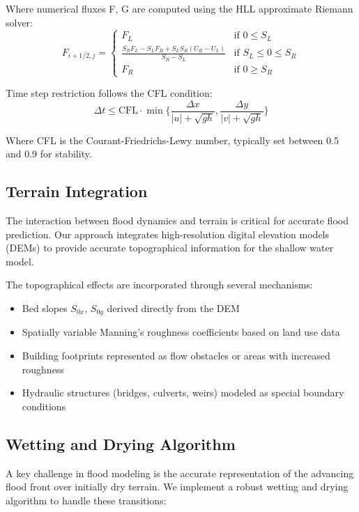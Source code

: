 \documentclass{article}
\begin{document}
Where numerical fluxes F, G are computed using the HLL approximate Riemann solver:
\begin{equation}
F_{i+1/2,j} = \begin{cases}
F_L & \text{if } 0 \leq S_L \\
\frac{S_RF_L - S_LF_R + S_LS_R(U_R - U_L)}{S_R - S_L} & \text{if } S_L \leq 0 \leq S_R \\
F_R & \text{if } 0 \geq S_R
\end{cases}
\end{equation}

Time step restriction follows the CFL condition:
\begin{equation}
\Delta t \leq \text{CFL} \cdot \min\{\frac{\Delta x}{|u| + \sqrt{gh}}, \frac{\Delta y}{|v| + \sqrt{gh}}\}
\end{equation}

Where CFL is the Courant-Friedrichs-Lewy number, typically set between 0.5 and 0.9 for stability.

\subsection{Terrain Integration}
The interaction between flood dynamics and terrain is critical for accurate flood prediction. Our approach integrates high-resolution digital elevation models (DEMs) to provide accurate topographical information for the shallow water model.

The topographical effects are incorporated through several mechanisms:
\begin{itemize}
    \item Bed slopes $S_{0x}$, $S_{0y}$ derived directly from the DEM
    \item Spatially variable Manning's roughness coefficients based on land use data
    \item Building footprints represented as flow obstacles or areas with increased roughness
    \item Hydraulic structures (bridges, culverts, weirs) modeled as special boundary conditions
\end{itemize}

\subsection{Wetting and Drying Algorithm}
A key challenge in flood modeling is the accurate representation of the advancing flood front over initially dry terrain. We implement a robust wetting and drying algorithm to handle these transitions:
\end{document}
